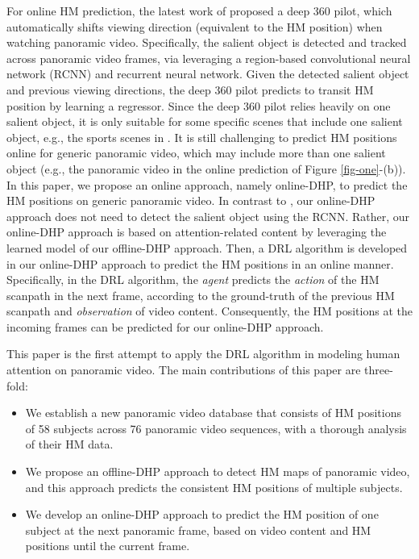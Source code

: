 \documentclass[10pt,journal,compsoc]{IEEEtran}
\begin{document}
For online HM prediction, the latest work of \cite{hu2017deep} proposed a deep 360 pilot, which automatically shifts viewing direction (equivalent to the HM position) when watching panoramic video. Specifically, the salient object is detected and tracked across panoramic video frames, via leveraging a region-based convolutional neural network (RCNN) \cite{ren2015faster} and recurrent neural network. Given the detected salient object and previous viewing directions, the deep 360 pilot predicts to transit HM position by learning a regressor. Since the deep 360 pilot relies heavily on one salient object, it is only suitable for some specific scenes that include one salient object, e.g., the sports scenes in \cite{hu2017deep}. It is still challenging to predict HM positions online for generic panoramic video, which may include more than one salient object (e.g., the panoramic video in the online prediction of Figure \ref{fig-one}-(b)). In this paper, we propose an online approach, namely online-DHP, to predict the HM positions on generic panoramic video. In contrast to \cite{hu2017deep}, our online-DHP approach does not need to detect the salient object using the RCNN. Rather, our online-DHP approach is based on attention-related content by leveraging the learned model of our offline-DHP approach. Then, a DRL algorithm is developed in our online-DHP approach to predict the HM positions in an online manner. Specifically, in the DRL algorithm, the \textit{agent} predicts the \textit{action} of the HM scanpath in the next frame, according to the ground-truth of the previous HM scanpath and \textit{observation} of video content. Consequently, the HM positions at the incoming frames can be predicted for our online-DHP approach.


This paper is the first attempt to apply the DRL algorithm in modeling human attention on panoramic video. The main contributions of this paper are three-fold:
\begin{itemize}
\item We establish a new panoramic video database that consists of HM positions of 58 subjects  across 76 panoramic video sequences, with a thorough analysis of their HM data.

\item We propose an offline-DHP approach to detect HM maps of panoramic video, and this approach predicts the consistent HM positions of multiple subjects.

\item We develop an online-DHP approach to predict the HM position of one subject at the next panoramic frame, based on video content and HM positions until the current frame.

\end{itemize}
\end{document}
